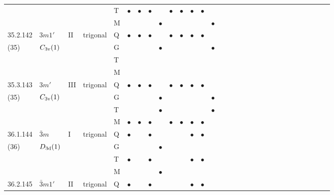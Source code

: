 \documentclass[fleqn,9pt,landscape]{jsarticle}
\begin{document}
\begin{longtable}{lllll|l|l|l|l|l|l|l|l|l|ll|ll|ll|ll|ll|ll|ll|ll}
 &  &  &  & T & $\bullet$ & $\bullet$ & $\bullet$ &  & $\bullet$ & $\bullet$ & $\bullet$ & $\bullet$ &  &  &  &  &  &  &  &  &  &  &  &  &  &  &  &  &  \\
 &  &  &  & M &  &  &  & $\bullet$ &  &  &  &  & $\bullet$ &  &  &  &  &  &  &  &  &  &  &  &  &  &  &  &  \\ \hline
35.2.142 & \texttt{$3m1'$} & II & trigonal & Q & $\bullet$ & $\bullet$ & $\bullet$ &  & $\bullet$ & $\bullet$ & $\bullet$ & $\bullet$ &  &  &  &  &  &  &  &  &  &  &  &  &  &  &  &  &  \\
(35) & $C_{\rm 3v}(1)$ &  &  & G &  &  &  & $\bullet$ &  &  &  &  & $\bullet$ &  &  &  &  &  &  &  &  &  &  &  &  &  &  &  &  \\
 &  &  &  & T &  &  &  &  &  &  &  &  &  &  &  &  &  &  &  &  &  &  &  &  &  &  &  &  &  \\
 &  &  &  & M &  &  &  &  &  &  &  &  &  &  &  &  &  &  &  &  &  &  &  &  &  &  &  &  &  \\ \hline
35.3.143 & \texttt{$3m'$} & III & trigonal & Q & $\bullet$ & $\bullet$ & $\bullet$ &  & $\bullet$ & $\bullet$ & $\bullet$ & $\bullet$ &  &  &  &  &  &  &  &  &  &  &  &  &  &  &  &  &  \\
(35) & $C_{\rm 3v}(1)$ &  &  & G &  &  &  & $\bullet$ &  &  &  &  & $\bullet$ &  &  &  &  &  &  &  &  &  &  &  &  &  &  &  &  \\
 &  &  &  & T &  &  &  & $\bullet$ &  &  &  &  & $\bullet$ &  &  &  &  &  &  &  &  &  &  &  &  &  &  &  &  \\
 &  &  &  & M & $\bullet$ & $\bullet$ & $\bullet$ &  & $\bullet$ & $\bullet$ & $\bullet$ & $\bullet$ &  &  &  &  &  &  &  &  &  &  &  &  &  &  &  &  &  \\ \hline
36.1.144 & \texttt{$\bar{3}m$} & I & trigonal & Q & $\bullet$ &  & $\bullet$ &  &  &  & $\bullet$ & $\bullet$ &  &  &  &  &  &  &  &  &  &  &  &  &  &  &  &  &  \\
(36) & $D_{\rm 3d}(1)$ &  &  & G &  &  &  & $\bullet$ &  &  &  &  &  &  &  &  &  &  &  &  &  &  &  &  &  &  &  &  &  \\
 &  &  &  & T & $\bullet$ &  & $\bullet$ &  &  &  & $\bullet$ & $\bullet$ &  &  &  &  &  &  &  &  &  &  &  &  &  &  &  &  &  \\
 &  &  &  & M &  &  &  & $\bullet$ &  &  &  &  &  &  &  &  &  &  &  &  &  &  &  &  &  &  &  &  &  \\ \hline
36.2.145 & \texttt{$\bar{3}m1'$} & II & trigonal & Q & $\bullet$ &  & $\bullet$ &  &  &  & $\bullet$ & $\bullet$ &  &  &  &  &  &  &  &  &  &  &  &  &  &  &  &  &  \\

\end{longtable}
\end{document}
